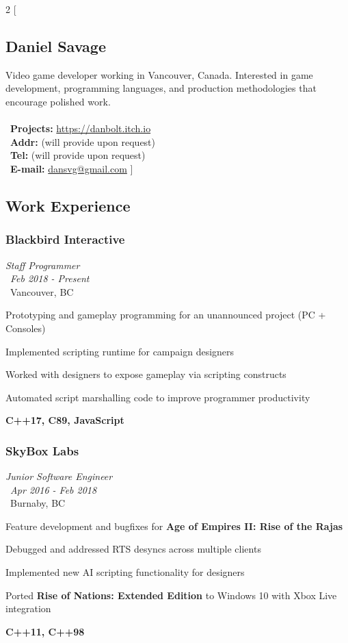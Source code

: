\documentclass{article}
\begin{document}
\begin{multicols*}{2}
[
\begin{center}
\section*{Daniel Savage}
\end{center}
Video game developer working in Vancouver, Canada. Interested in game development, programming languages, and production methodologies that encourage polished work. \\\
\\\
\textbf{Projects:} \href{https://danbolt.itch.io}{https://danbolt.itch.io} \\\
\textbf{Addr:} (will provide upon request) \\\
\textbf{Tel:} (will provide upon request) \\\
\textbf{E-mail:} \href{mailto:dansvg@gmail.com}{dansvg@gmail.com}
]
\subsection*{Work Experience}

\subsubsection*{Blackbird Interactive}
\textit{Staff Programmer} \\\
\textit{Feb 2018 - Present} \\\
Vancouver, BC
\begin{compactitem}
  \item Prototyping and gameplay programming for an unannounced project (PC + Consoles)
  \item Implemented scripting runtime for campaign designers
  \item Worked with designers to expose gameplay via scripting constructs
  \item Automated script marshalling code to improve programmer productivity
  \item \textbf{C++17, C89, JavaScript}
\end{compactitem}

\subsubsection*{SkyBox Labs}
\textit{Junior Software Engineer} \\\
\textit{Apr 2016 - Feb 2018} \\\
Burnaby, BC	
\begin{compactitem}
  \item Feature development and bugfixes for \textbf{Age of Empires II: Rise of the Rajas}
  \item Debugged and addressed RTS desyncs across multiple clients
  \item Implemented new AI scripting functionality for designers
  \item Ported \textbf{Rise of Nations: Extended Edition} to Windows 10 with Xbox Live integration
  \item \textbf{C++11, C++98}
\end{compactitem}


\end{multicols*}
\end{document}
